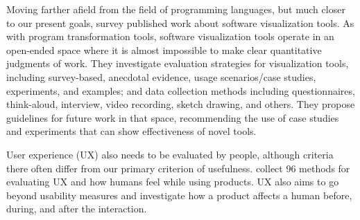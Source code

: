 Moving farther afield from the field of programming languages, but
much closer to our present goals,
 survey
published work about software visualization tools. As with
program transformation tools, software visualization tools operate in
an open-ended space where it is almost impossible to make clear
quantitative judgments of work. They investigate evaluation strategies
for visualization tools, including survey-based, anecdotal evidence,
usage scenarios/case studies, experiments, and examples; and data
collection methods including questionnaires, think-aloud, interview,
video recording, sketch drawing, and others. They propose guidelines
for future work in that space, recommending the use of case studies
and experiments that can show effectiveness of novel tools.

User experience (UX) also needs to be evaluated by people, although
criteria there often differ from our primary criterion of
usefulness.  collect 96
methods for evaluating UX and how humans feel while using products.
UX also aims to go beyond usability measures and investigate
how a product affects a human before, during, and after the interaction.
